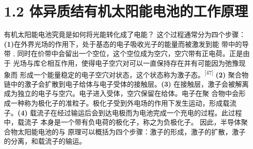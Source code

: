 \documentclass[12pt,]{report}
\begin{document}
\section{1.2
体异质结有机太阳能电池的工作原理}\label{ux4f53ux5f02ux8d28ux7ed3ux6709ux673aux592aux9633ux80fdux7535ux6c60ux7684ux5de5ux4f5cux539fux7406}

有机太阳能电池究竟是如何将光能转化成了电能？ 这个过程通常分为四个步骤：
\textbf{(1)}在外界光场的作用下，处于基态的电子吸收光子的能量而被激发到能
带中的导带 ,
同时在价带中会留出一个空位，这个空位成为空穴，空穴带有正电荷。正是由于
光场与库仑相互作用，使得电子空穴对可以一直保持存在并有可能因为弛豫现象而
形成一个能量稳定的电子空穴对状态，这个状态称为激子态。\textsuperscript{{[}47{]}}
\textbf{(2)}
聚合物链中的激子会扩散到电子给体与电子受体的接触层。\textbf{(3)}
在接触层，激子会被解离成为独立的电子与空穴。电子进入受体，空穴保留在给体。电子在聚
合物中会形成一种称为极化子的准粒子。极化子受到外电场的作用下发生运动，形成载流
子。\textbf{(4)}
载流子在经过输运后会到达电极而为电池完成一个充电的过程。此过程中，载流子
本身是一个带有负电荷的极化子，称之为负极化子。
因此，半导体聚合物太阳能电池的与
原理可以概括为四个步骤：激子的形成，激子的扩散，激子的分离，和载流子的输运。
\end{document}
